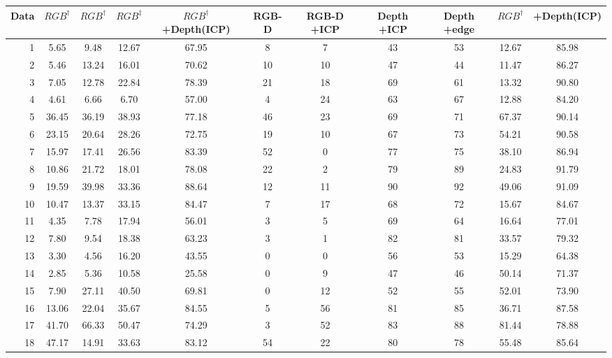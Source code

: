{\begin{table}[t]
\begin{adjustbox}{max width=\textwidth}
\begin{tabular}{r|ccc|ccccc|cc}
			Data & $RGB^\dag$ & $RGB^\dag$ &$RGB^\ddag$ & $RGB^\dag$+Depth(ICP)  & RGB-D &RGB-D +ICP  & Depth +ICP & Depth +edge & $RGB^\dag$ & +Depth(ICP)\\     
			\midrule                                                  
			1 &       5.65 &   		9.48 &   12.67 &   67.95  & 8&  7 &  43 &   53 & 12.67 &     85.98 \\
			2 &       5.46 &   		13.24 &  16.01 &   70.62  & 10&     10 &  47 &   44 & 11.47 &     86.27 \\
			3 &       7.05 &   		12.78 &  22.84 &   78.39  & 21&     18 &  69 &   61 & 13.32 &     90.80 \\
			4 &       4.61 &   		6.66 &   6.70 &    57.00  & 4&  24 &  63 &   67 & 12.88 &     84.20 \\
			5 &      36.45 &   		36.19 &  38.93 &   77.18  & 46&     23 &  69 &   71 & 67.37 &     90.14 \\
			6 &      23.15 &   		20.64 &  28.26 &   72.75  & 19&     10 &  67 &   73 & 54.21 &     90.58 \\
			7 &      15.97 &   		17.41 &  26.56 &   83.39  & 52&     0 &  77 &   75 & 38.10 &     86.94 \\
			8 &       10.86 &  		21.72 &  18.01 &   78.08  & 22&     2 &  79 &  89 & 24.83 &     91.79 \\
			9 &      19.59 &   		39.98 &  33.36 &   88.64  & 12&     11 &  90 &   92 & 49.06 &     91.09 \\
			10 &       10.47 & 		13.37 &  33.15 &   84.47  & 7&      17 &  68 &  72 & 15.67 &     84.67 \\
			11 &       4.35 &  		7.78 &   17.94 &   56.01  & 3&  5 &  69 &   64 & 16.64 &     77.01 \\
			12 &       7.80 &  		9.54 &   18.38 &   63.23  & 3&  1 &  82 &   81 & 33.57 &     79.32 \\
			13 &       3.30 &  		4.56 &   16.20 &   43.55  & 0&  0 &  56 &   53 & 15.29 &     64.38 \\
			14 &       2.85 &  		5.36 &   10.58 &   25.58  & 0&  9 &  47 &   46 & 50.14 &     71.37 \\
			15 &       7.90 &  		27.11 &  40.50 &   69.81  & 0&  12 &  52 &   55 & 52.01 &     73.90 \\
			16 &      13.06 &  		22.04 &  35.67 &   84.55  & 5&  56 &  81 &   85 & 36.71 &     87.58 \\
			17 &      41.70 &  		66.33 &  50.47 &   74.29  & 3&  52 &  83 &   88 & 81.44 &     78.88 \\
			18 &      47.17 &  		14.91 &  33.63 &   83.12  & 54&     22 &  80 &   78 & 55.48 &     85.64 \\

\end{tabular}
\end{adjustbox}
\end{table}}
